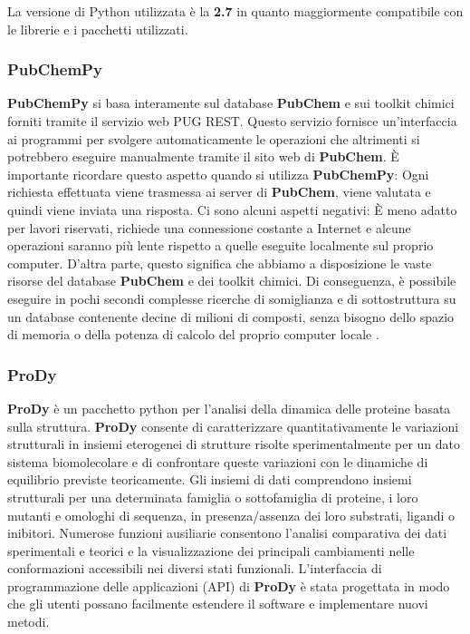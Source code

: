 La versione di Python utilizzata è la \textbf{2.7} in quanto maggiormente compatibile con le librerie e i pacchetti utilizzati.

\subsubsection{PubChemPy}
\textbf{PubChemPy} si basa interamente sul database \textbf{PubChem} e sui toolkit chimici forniti tramite il servizio web PUG REST. Questo servizio fornisce un'interfaccia ai programmi per svolgere automaticamente le operazioni che altrimenti si potrebbero eseguire manualmente tramite il sito web di \textbf{PubChem}. È importante ricordare questo aspetto quando si utilizza \textbf{PubChemPy}: Ogni richiesta effettuata viene trasmessa ai server di \textbf{PubChem}, viene valutata e quindi viene inviata una risposta. Ci sono alcuni aspetti negativi: È meno adatto per lavori riservati, richiede una connessione costante a Internet e alcune operazioni saranno più lente rispetto a quelle eseguite localmente sul proprio computer. D'altra parte, questo significa che abbiamo a disposizione le vaste risorse del database \textbf{PubChem} e dei toolkit chimici. Di conseguenza, è possibile eseguire in pochi secondi complesse ricerche di somiglianza e di sottostruttura su un database contenente decine di milioni di composti, senza bisogno dello spazio di memoria o della potenza di calcolo del proprio computer locale \cite{PubChempyDocumentation}.

\subsubsection{ProDy}
\textbf{ProDy} è un pacchetto python per l'analisi della dinamica delle proteine basata sulla struttura. \textbf{ProDy} consente di caratterizzare quantitativamente le variazioni strutturali in insiemi eterogenei di strutture risolte sperimentalmente per un dato sistema biomolecolare e di confrontare queste variazioni con le dinamiche di equilibrio previste teoricamente. Gli insiemi di dati comprendono insiemi strutturali per una determinata famiglia o sottofamiglia di proteine, i loro mutanti e omologhi di sequenza, in presenza/assenza dei loro substrati, ligandi o inibitori. Numerose funzioni ausiliarie consentono l'analisi comparativa dei dati sperimentali e teorici e la visualizzazione dei principali cambiamenti nelle conformazioni accessibili nei diversi stati funzionali. L'interfaccia di programmazione delle applicazioni (API) di \textbf{ProDy} è stata progettata in modo che gli utenti possano facilmente estendere il software e implementare nuovi metodi\cite{10.1093/bioinformatics/btr168}.


